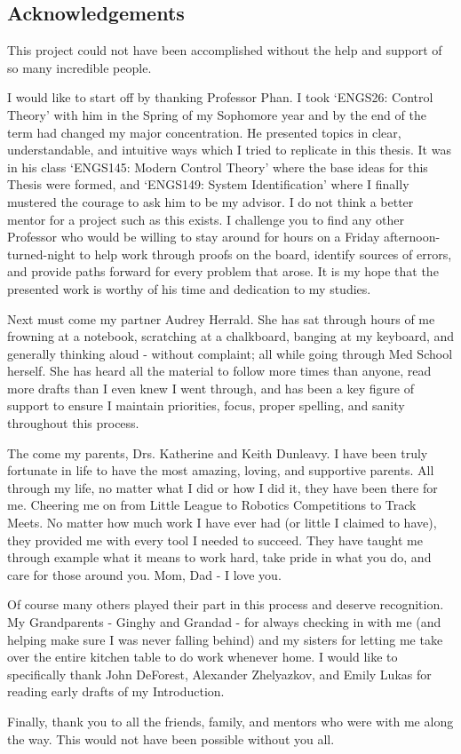 \pagestyle{plain}
\begin{center}


\section*{Acknowledgements}


\end{center}
This project could not have been accomplished without the help and support of so many incredible people.

I would like to start off by thanking Professor Phan. I took `ENGS26: Control Theory' with him in the Spring of my Sophomore year and by the end of the term had changed my major concentration. He presented topics in clear, understandable, and intuitive ways which I tried to replicate in this thesis. It was in his class `ENGS145: Modern Control Theory' where the base ideas for this Thesis were formed, and `ENGS149: System Identification' where I finally mustered the courage to ask him to be my advisor. I do not think a better mentor for a project such as this exists. I challenge you to find any other Professor who would be willing to stay around for hours on a Friday afternoon-turned-night to help work through proofs on the board, identify sources of errors, and provide paths forward for every problem that arose. It is my hope that the presented work is worthy of his time and dedication to my studies.

Next must come my partner Audrey Herrald. She has sat through hours of me frowning at a notebook, scratching at a chalkboard, banging at my keyboard, and generally thinking aloud - without complaint; all while going through Med School herself. She has heard all the material to follow more times than anyone, read more drafts than I even knew I went through, and has been a key figure of support to ensure I maintain priorities, focus, proper spelling, and sanity throughout this process. 

The come my parents, Drs. Katherine and Keith Dunleavy. I have been truly fortunate in life to have the most amazing, loving, and supportive parents. All through my life, no matter what I did or how I did it, they have been there for me. Cheering me on from Little League to Robotics Competitions to Track Meets. No matter how much work I have ever had (or little I claimed to have), they provided me with every tool I needed to succeed. They have taught me through example what it means to work hard, take pride in what you do, and care for those around you. Mom, Dad - I love you.

Of course many others played their part in this process and deserve recognition. My Grandparents - Ginghy and Grandad - for always checking in with me (and helping make sure I was never falling behind) and my sisters for letting me take over the entire kitchen table to do work whenever home. I would like to specifically thank John DeForest, Alexander Zhelyazkov, and Emily Lukas for reading early drafts of my Introduction. 

Finally, thank you to all the friends, family, and mentors who were with me along the way. This would not have been possible without you all.
\cleardoublepage%
